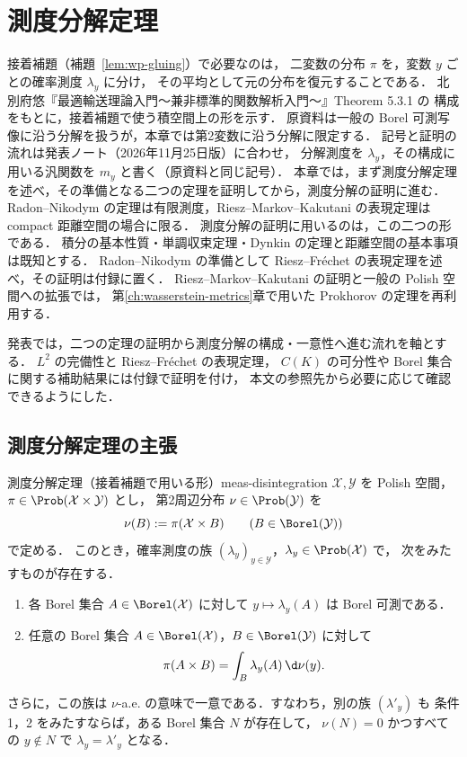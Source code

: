 \chapter{測度分解定理}
\label{ch:disintegration}

接着補題（補題~\ref{lem:wp-gluing}）で必要なのは，
二変数の分布 $\pi$ を，変数 $y$ ごとの確率測度 $\lambda_y$ に分け，
その平均として元の分布を復元することである．
北別府悠『最適輸送理論入門〜兼非標準的関数解析入門〜』Theorem 5.3.1 の
構成をもとに，接着補題で使う積空間上の形を示す．
原資料は一般の Borel 可測写像に沿う分解を扱うが，本章では第2変数に沿う分解に限定する．
記号と証明の流れは発表ノート（2026年11月25日版）に合わせ，
分解測度を $\lambda_y$，その構成に用いる汎関数を $m_y$ と書く（原資料と同じ記号）．
本章では，まず測度分解定理を述べ，その準備となる二つの定理を証明してから，測度分解の証明に進む．
Radon--Nikodym の定理は有限測度，Riesz--Markov--Kakutani の表現定理は compact 距離空間の場合に限る．
測度分解の証明に用いるのは，この二つの形である．
積分の基本性質・単調収束定理・Dynkin の定理と距離空間の基本事項は既知とする．
Radon--Nikodym の準備として Riesz--Fréchet の表現定理を述べ，その証明は付録に置く．
Riesz--Markov--Kakutani の証明と一般の Polish 空間への拡張では，
第\ref{ch:wasserstein-metrics}章で用いた Prokhorov の定理を再利用する．

発表では，二つの定理の証明から測度分解の構成・一意性へ進む流れを軸とする．
$L^2$ の完備性と Riesz--Fréchet の表現定理，
$C(K)$ の可分性や Borel 集合に関する補助結果には付録で証明を付け，
本文の参照先から必要に応じて確認できるようにした．

\section{測度分解定理の主張}

\begin{theorem}{測度分解定理（接着補題で用いる形）}{meas-disintegration}
  $\mathcal{X},\mathcal{Y}$ を Polish 空間，$\pi\in\Prob(\mathcal{X}\times\mathcal{Y})$ とし，
  第2周辺分布 $\nu\in\Prob(\mathcal{Y})$ を
  \[
    \nu(B):=\pi(\mathcal{X}\times B)\qquad(B\in\Borel(\mathcal{Y}))
  \]
  で定める．
  このとき，確率測度の族 $(\lambda_y)_{y\in\mathcal{Y}}$，$\lambda_y\in\Prob(\mathcal{X})$ で，
  次をみたすものが存在する．
  \begin{enumerate}
    \item 各 Borel 集合 $A\in\Borel(\mathcal{X})$ に対して $y\mapsto\lambda_y(A)$ は Borel 可測である．
    \item 任意の Borel 集合 $A\in\Borel(\mathcal{X})$，$B\in\Borel(\mathcal{Y})$ に対して
      \[
        \pi(A\times B)=\int_B\lambda_y(A)\,\d\nu(y).
      \]
  \end{enumerate}
  さらに，この族は $\nu$-a.e. の意味で一意である．すなわち，別の族 $(\lambda'_y)$ も
  条件 1，2 をみたすならば，ある Borel 集合 $N$ が存在して，
  $\nu(N)=0$ かつすべての $y\notin N$ で $\lambda_y=\lambda'_y$ となる．
\end{theorem}

